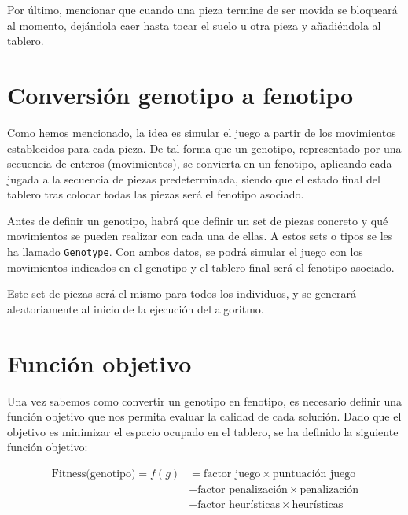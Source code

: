 \documentclass[11pt,spanish,listoffigures,listoftables]{tfgetsinf}
\begin{document}
Por último, mencionar que cuando una pieza termine de ser movida se bloqueará al momento, dejándola caer hasta tocar el suelo u otra pieza y añadiéndola al tablero.

\section{Conversión genotipo a fenotipo}
Como hemos mencionado, la idea es simular el juego a partir de los movimientos establecidos para cada pieza. De tal forma que un genotipo, representado por una secuencia de enteros (movimientos), se convierta en un fenotipo, aplicando cada jugada a la secuencia de piezas predeterminada, siendo que el estado final del tablero tras colocar todas las piezas será el fenotipo asociado.

Antes de definir un genotipo, habrá que definir un set de piezas concreto y qué movimientos se pueden realizar con cada una de ellas. A estos sets o tipos se les ha llamado \texttt{Genotype}. Con ambos datos, se podrá simular el juego con los movimientos indicados en el genotipo y el tablero final será el fenotipo asociado.

Este set de piezas será el mismo para todos los individuos, y se generará aleatoriamente al inicio de la ejecución del algoritmo. 

\section{Función objetivo}
Una vez sabemos como convertir un genotipo en fenotipo, es necesario definir una función objetivo que nos permita evaluar la calidad de cada solución. Dado que el objetivo es minimizar el espacio ocupado en el tablero, se ha definido la siguiente función objetivo:

\begin{align*}
\text{Fitness(genotipo)} = f(g) &= \text{factor juego}\times\text{puntuación juego} \\
&+ \text{factor penalización}\times\text{penalización} \\
&+ \text{factor heurísticas}\times\text{heurísticas}
\end{align*}
\end{document}
